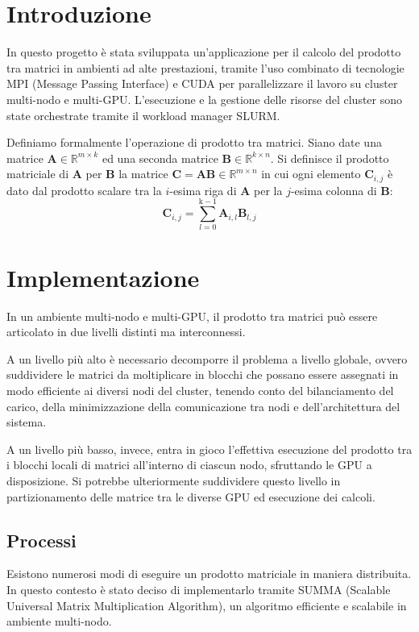 \documentclass[a4paper]{article}
\begin{document}
\begingroup
\let\clearpage\relax

\endgroup

\section{Introduzione}

In questo progetto è stata sviluppata un'applicazione per il calcolo del prodotto tra matrici in ambienti ad alte prestazioni, tramite l’uso combinato di tecnologie MPI (Message Passing Interface) e CUDA per parallelizzare il lavoro su cluster multi-nodo e multi-GPU. L'esecuzione e la gestione delle risorse del cluster sono state orchestrate tramite il workload manager SLURM.

Definiamo formalmente l'operazione di prodotto tra matrici.
Siano date una matrice $\mathbf{A} \in \mathbb{R}^{m\times{k}}$ ed una seconda matrice $\mathbf{B} \in \mathbb{R}^{k\times{n}}$.
Si definisce il prodotto matriciale di $\mathbf{A}$ per $\mathbf{B}$ la matrice $\mathbf{C}=\mathbf{A}\mathbf{B} \in \mathbb{R}^{m\times{n}}$ in cui ogni elemento $\mathbf{C}_{i,j}$ è dato dal prodotto scalare tra la $i$-esima riga di $\mathbf{A}$ per la $j$-esima colonna di $\mathbf{B}$:
$$ \mathbf{C}_{i,j} = \sum_{l=0}^{\text{k}-1} \mathbf{A}_{i, l} \mathbf{B}_{l, j} $$

\section{Implementazione}
In un ambiente multi-nodo e multi-GPU, il prodotto tra matrici può essere articolato in due livelli distinti ma interconnessi.

A un livello più alto è necessario decomporre il problema a livello globale, ovvero suddividere le matrici da moltiplicare in blocchi che possano essere assegnati in modo efficiente ai diversi nodi del cluster, tenendo conto del bilanciamento del carico, della minimizzazione della comunicazione tra nodi e dell'architettura del sistema.

A un livello più basso, invece, entra in gioco l’effettiva esecuzione del prodotto tra i blocchi locali di matrici all’interno di ciascun nodo, sfruttando le GPU a disposizione. Si potrebbe ulteriormente suddividere questo livello in partizionamento delle matrice tra le diverse GPU ed esecuzione dei calcoli.

\subsection{Processi}
Esistono numerosi modi di eseguire un prodotto matriciale in maniera distribuita. In questo contesto è stato deciso di implementarlo tramite SUMMA (Scalable Universal Matrix Multiplication Algorithm), un algoritmo efficiente e scalabile in ambiente multi-nodo\cite{SUMMA}.
\end{document}
